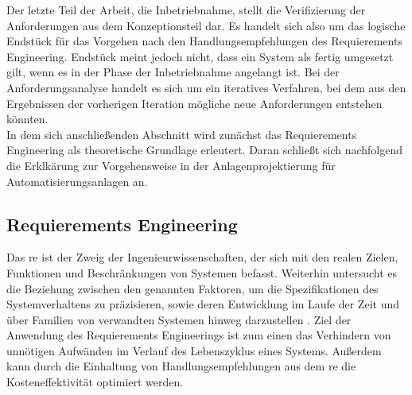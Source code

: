 \documentclass[../Bachelorarbeit.tex]{subfiles}
\begin{document}
Der letzte Teil der Arbeit, die Inbetriebnahme, stellt die Verifizierung der Anforderungen aus dem Konzeptionsteil dar. Es handelt sich also um das logische Endstück für das Vorgehen nach den Handlungsempfehlungen des Requierements Engineering. Endstück meint jedoch nicht, dass ein System als fertig umgesetzt gilt, wenn es in der Phase der Inbetriebnahme angelangt ist. Bei der Anforderungsanalyse handelt es sich um ein iteratives Verfahren, bei dem aus den Ergebnissen der vorherigen Iteration mögliche neue Anforderungen entstehen könnten.\\ %
In dem sich anschließenden Abschnitt wird zunächst das Requierements Engineering als theoretische Grundlage erleutert. Daran schließt sich nachfolgend die Erklkärung zur Vorgehensweise in der Anlagenprojektierung für Automatisierungsanlagen an. 

\subsection{Requierements Engineering}
Das \ac{re} ist der Zweig der Ingenieurwissenschaften, der sich mit den realen Zielen, Funktionen und Beschränkungen von Systemen befasst. Weiterhin untersucht es die Beziehung zwischen den genannten Faktoren, um die Spezifikationen des Systemverhaltens zu präzisieren, sowie deren Entwicklung im Laufe der Zeit und über Familien von verwandten Systemen hinweg darzustellen \cite[2-3]{Laplante2014}. Ziel der Anwendung des Requierements Engineerings ist zum einen das Verhindern von unnötigen Aufwänden im Verlauf des Lebenszyklus eines Systems. Außerdem kann durch die Einhaltung von Handlungsempfehlungen aus dem \acs{re} die Kosteneffektivität optimiert werden.
\end{document}
